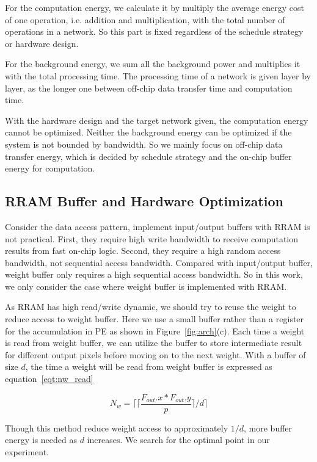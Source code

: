 \documentclass[10pt, conference]{IEEEtran}
\begin{document}
    For the computation energy, we calculate it by multiply the average energy cost of one operation, i.e. addition and multiplication, with the total number of operations in a network. So this part is fixed regardless of the schedule strategy or hardware design.
    
    For the background energy, we sum all the background power and multiplies it with the total processing time. The processing time of a network is given layer by layer, as the longer one between off-chip data transfer time and computation time.
    
    With the hardware design and the target network given, the computation energy cannot be optimized. Neither the background energy can be optimized if the system is not bounded by bandwidth. So we mainly focus on off-chip data transfer energy, which is decided by schedule strategy and the on-chip buffer energy for computation.
    
    \subsection{RRAM Buffer and Hardware Optimization}
    Consider the data access pattern, implement input/output buffers with RRAM is not practical. First, they require high write bandwidth to receive computation results from fast on-chip logic. Second, they require a high random access bandwidth, not sequential access bandwidth. Compared with input/output buffer, weight buffer only requires a high sequential access bandwidth. So in this work, we only consider the case where weight buffer is implemented with RRAM.
    
    As RRAM has high read/write dynamic, we should try to reuse the weight to reduce access to weight buffer. Here we use a small buffer rather than a register for the accumulation in PE as shown in Figure~\ref{fig:arch}(c). Each time a weight is read from weight buffer, we can utilize the buffer to store intermediate result for different output pixels before moving on to the next weight. With a buffer of size $d$, the time a weight will be read from weight buffer is expressed as equation~\ref{eqt:nw_read}
    
    \begin{equation}\label{eqt:nw_read}
      N_w = \lceil \lceil \frac{F_{out}.x * F_{out}.y}{p}\rceil \slash d \rceil
    \end{equation}
    
    Though this method reduce weight access to approximately $1/d$, more buffer energy is needed as $d$ increases. We search for the optimal point in our experiment.
    
\end{document}

